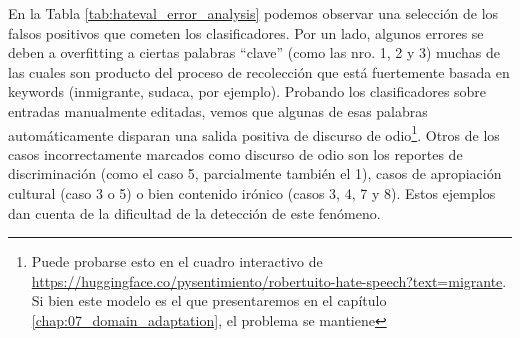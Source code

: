 En la Tabla \ref{tab:hateval_error_analysis} podemos observar una selección de los falsos positivos que cometen los clasificadores. Por un lado, algunos errores se deben a overfitting a ciertas palabras ``clave'' (como las nro. 1, 2 y 3) muchas de las cuales son producto del proceso de recolección que está fuertemente basada en keywords (inmigrante, sudaca, por ejemplo). Probando los clasificadores sobre entradas manualmente editadas, vemos que algunas de esas palabras automáticamente disparan una salida positiva de discurso de odio\footnote{Puede probarse esto en el cuadro interactivo de \url{https://huggingface.co/pysentimiento/robertuito-hate-speech?text=migrante}. Si bien este modelo es el que presentaremos en el capítulo \ref{chap:07_domain_adaptation}, el problema se mantiene}. Otros de los casos incorrectamente marcados como discurso de odio son los reportes de discriminación (como el caso 5, parcialmente también el 1), casos de apropiación cultural (caso 3 o 5) o bien contenido irónico (casos 3, 4, 7 y 8). Estos ejemplos dan cuenta de la dificultad de la detección de este fenómeno.


